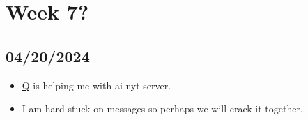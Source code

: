 \newpage
\section{Week 7?}
\subsection*{04/20/2024}
\begin{itemize}
    \item \textcolor{blue}{\href{https://github.com/queazyg}{Q}} is helping me with ai nyt server.
    \item I am hard stuck on messages so perhaps we will crack it together.
\end{itemize}
